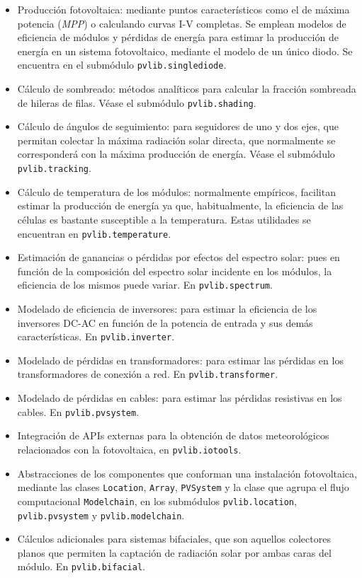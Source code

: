 \begin{itemize}
      \item Producción fotovoltaica: mediante puntos característicos como el de máxima potencia (\textit{MPP}) o calculando curvas I-V completas. Se emplean modelos de eficiencia de módulos y pérdidas de energía para estimar la producción de energía en un sistema fotovoltaico, mediante el modelo de un único diodo. Se encuentra en el submódulo \lstinline{pvlib.singlediode}.
      \item Cálculo de sombreado: métodos analíticos para calcular la fracción sombreada de hileras de filas. Véase el submódulo \lstinline{pvlib.shading}.
      \item Cálculo de ángulos de seguimiento: para seguidores de uno y dos ejes, que permitan colectar la máxima radiación solar directa, que normalmente se corresponderá con la máxima producción de energía. Véase el submódulo \lstinline{pvlib.tracking}.
      \item Cálculo de temperatura de los módulos: normalmente empíricos, facilitan estimar la producción de energía ya que, habitualmente, la eficiencia de las células es bastante susceptible a la temperatura. Estas utilidades se encuentran en \lstinline{pvlib.temperature}.
      \item Estimación de ganancias o pérdidas por efectos del espectro solar: pues en función de la composición del espectro solar incidente en los módulos, la eficiencia de los mismos puede variar. En \lstinline{pvlib.spectrum}.
      \item Modelado de eficiencia de inversores: para estimar la eficiencia de los inversores DC-AC en función de la potencia de entrada y sus demás características. En \lstinline{pvlib.inverter}.
      \item Modelado de pérdidas en transformadores: para estimar las pérdidas en los transformadores de conexión a red. En \lstinline{pvlib.transformer}.
      \item Modelado de pérdidas en cables: para estimar las pérdidas resistivas en los cables. En \lstinline{pvlib.pvsystem}.
      \item Integración de APIs externas para la obtención de datos meteorológicos relacionados con la fotovoltaica, en \lstinline{pvlib.iotools}.
      \item Abstracciones de los componentes que conforman una instalación fotovoltaica, mediante las clases \lstinline{Location}, \lstinline{Array}, \lstinline{PVSystem} y la clase que agrupa el flujo computacional \lstinline{Modelchain}, en los submódulos \lstinline{pvlib.location}, \lstinline{pvlib.pvsystem} y \lstinline{pvlib.modelchain}.
      \item Cálculos adicionales para sistemas bifaciales, que son aquellos colectores planos que permiten la captación de radiación solar por ambas caras del módulo. En \lstinline{pvlib.bifacial}.

\end{itemize}

